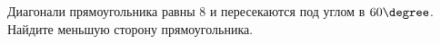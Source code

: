 \begin{ex}
	\begin{condition}
		Диагонали прямоугольника равны \( 8  \) и пересекаются	под углом в \( 60\degree \). Найдите меньшую сторону прямоугольника.
	\end{condition}
\end{ex}